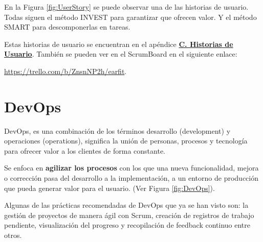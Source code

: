 \documentclass[12pt,twoside,titlepage]{report}
\begin{document}
En la Figura \ref{fig:UserStory} se puede observar una de las historias de usuario. Todas siguen el método INVEST para garantizar que ofrecen valor. Y el método SMART para descomponerlas en tareas. \cite{invest}
 

Estas historias de usuario se encuentran en el apéndice \hyperref[sec:UserStories]{\textbf{C. Historias de Usuario}}. También se pueden ver en el ScrumBoard en el siguiente enlace: 

\url{https://trello.com/b/ZnsnNP2h/earfit}.


\section{DevOps}
\label{sec:DevOps}

DevOps, es una combinación de los términos desarrollo (development) y operaciones (operations), significa la unión de personas, procesos y tecnología para ofrecer valor a los clientes de forma constante.

Se enfoca en \textbf{agilizar los procesos} con los que una nueva funcionalidad, mejora o corrección pasa del desarrollo a la implementación, a un entorno de producción que pueda generar valor para el usuario.
(Ver Figura \ref{fig:DevOps}).

Algunas de las prácticas recomendadas de DevOps que ya se han visto son: la gestión de proyectos de manera ágil con Scrum, creación de registros de trabajo pendiente, visualización del progreso y recopilación de feedback continuo entre otros.
\end{document}
